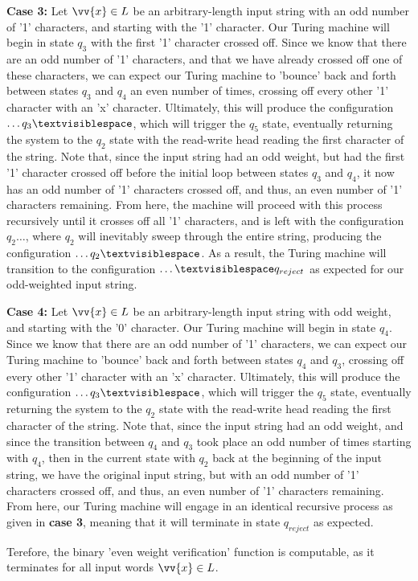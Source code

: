 \documentclass{article}
\begin{document}
\begin{prf}
\begin{adjustwidth}{0.5cm}{}
\end{adjustwidth}
\begin{adjustwidth}{0.5cm}{}
	\textbf{Case 3:} Let $\vv{x} \in L$ be an arbitrary-length input string with an odd number of '1' characters, and starting with the '1' character.  Our Turing machine will begin in state $q_{3}$ with the first '1' character crossed off.  Since we know that there are an odd number of '1' characters, and that we have already crossed off one of these characters, we can expect our Turing machine to 'bounce' back and forth between states $q_{3}$ and $q_{4}$ an even number of times, crossing off every other '1' character with an 'x' character.  Ultimately, this will produce the configuration $\dots q_{3}\textvisiblespace$, which will trigger the $q_{5}$ state, eventually returning the system to the $q_{2}$ state with the read-write head reading the first character of the string.  Note that, since the input string had an odd weight, but had the first '1' character crossed off before the initial loop between states $q_{3}$ and $q_{4}$, it now has an odd number of '1' characters crossed off, and thus, an even number of '1' characters remaining.  From here, the machine will proceed with this process recursively until it crosses off all '1' characters, and is left with the configuration $q_{2} \dots$, where $q_{2}$ will inevitably sweep through the entire string, producing the configuration $\dots q_{2} \textvisiblespace$.  As a result, the Turing machine will transition to the configuration $\dots \textvisiblespace q_{reject}$ as expected for our odd-weighted input string.\\
\end{adjustwidth}
\begin{adjustwidth}{0.5cm}{}
	\textbf{Case 4:} Let $\vv{x} \in L$ be an arbitrary-length input string with odd weight, and starting with the '0' character.  Our Turing machine will begin in state $q_{4}$.  Since we know that there are an odd number of '1' characters, we can expect our Turing machine to 'bounce' back and forth between states $q_{4}$ and $q_{3}$, crossing off every other '1' character with an 'x' character.  Ultimately, this will produce the configuration $\dots q_{3}\textvisiblespace$, which will trigger the $q_{5}$ state, eventually returning the system to the $q_{2}$ state with the read-write head reading the first character of the string.  Note that, since the input string had an odd weight, and since the transition between $q_{4}$ and $q_{3}$ took place an odd number of times starting with $q_{4}$, then in the current state with $q_{2}$ back at the beginning of the input string, we have the original input string, but with an odd number of '1' characters crossed off, and thus, an even number of '1' characters remaining.  From here, our Turing machine will engage in an identical recursive process as given in \textbf{case 3}, meaning that it will terminate in state $q_{reject}$ as expected.\\
\end{adjustwidth}
Terefore, the binary 'even weight verification' function is computable, as it terminates for all input words $\vv{x} \in L$. \qedsymbol
\end{prf}
\end{document}
